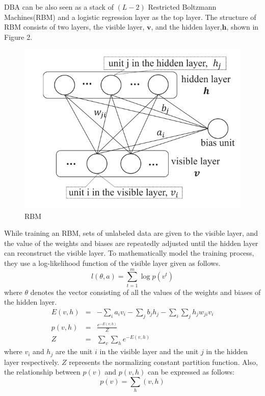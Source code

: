 \documentclass[11pt]{report}
\newcommand{\mb}{\mathbf}
\begin{document}
	DBA can be also seen as a stack of $\left(L-2\right)$ Restricted Boltzmann Machines(RBM) and a logistic regression layer as the top layer. The structure of RBM consists of two layers, the visible layer, $\mb{v}$, and the hidden layer,$\mb{h}$, shown in Figure 2.
	\begin{figure}[h!]
		\centering
		\includegraphics[width=0.5\linewidth]{figure2.png}
		\caption{RBM}
		\label{fig-label}
	\end{figure}
	While training an RBM, sets of unlabeled data are given to the visible layer, and the value of the weights and biases are repeatedly adjusted until the hidden layer can reconstruct the visible layer. To mathematically model the training process, they use a log-likelihood function of the visible layer given as follows.
	\begin{equation}
	l\left(\theta,a\right)=\sum_{t=1}^{m}\log{p\left(v^t\right)}
	\end{equation}
	where $\theta$ denotes the vector consisting of all the values of the weights and biases of the hidden layer.\\
	\begin{eqnarray}
	E\left(v,h\right) &=& -\sum_{i}a_iv_i-\sum_{j}b_jh_j-\sum_{i}\sum_{j}h_jw_{ji}v_i\\
	p\left(v,h\right) &=& \frac{e^{-E\left(v,h\right)}}{Z}\\
	Z &=& \sum_{v}\sum_{h}e^{-E\left(v,h\right)}
	\end{eqnarray}
	where $v_i$ and $h_j$ are the unit $i$ in the visible layer and the unit $j$ in the hidden layer respectively. $Z$ represents the normalizing constant partition function. Also, the relationship between $p\left(v\right)$ and $p\left(v,h\right)$ can be expressed as follows:\\
	\begin{equation}
	p\left(v\right)=\sum_{h}\left(v,h\right)
	\end{equation}
\end{document}
